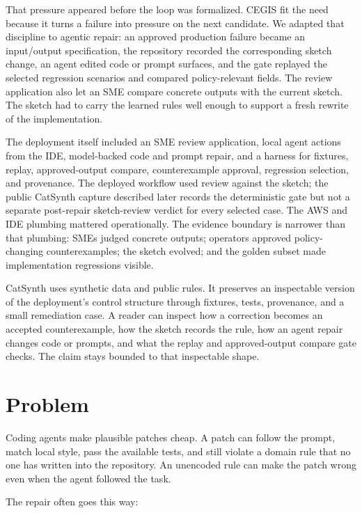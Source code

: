 \documentclass[11pt]{article}
\begin{document}
That pressure appeared before the loop was formalized.  CEGIS fit the need because it turns a
failure into pressure on the next candidate.  We adapted that discipline to agentic repair: an
approved production failure became an input/output specification, the repository recorded the
corresponding sketch change, an agent edited code or prompt surfaces, and the gate replayed the
selected regression scenarios and compared policy-relevant fields.  The review application also
let an SME compare concrete outputs with the current sketch.  The sketch had to carry the learned
rules well enough to support a fresh rewrite of the implementation.

The deployment itself included an SME review application, local agent actions from the IDE,
model-backed code and prompt repair, and a harness for fixtures, replay, approved-output compare,
counterexample approval, regression selection, and provenance.  The deployed workflow used
review against the sketch; the public CatSynth capture described later records the deterministic
gate but not a separate post-repair sketch-review verdict for every selected case.  The AWS and
IDE plumbing mattered
operationally.  The evidence boundary is narrower than that plumbing: SMEs judged concrete
outputs; operators approved policy-changing counterexamples; the sketch evolved; and the golden
subset made implementation regressions visible.

CatSynth uses synthetic data and public rules.  It preserves an inspectable version of the
deployment's control structure through fixtures, tests, provenance, and a small remediation
case.  A reader can
inspect how a correction becomes an accepted counterexample, how the sketch records the rule, how
an agent repair changes code or prompts, and what the replay and approved-output compare gate checks.  The claim
stays bounded to that inspectable shape.

\section{Problem}
\label{sec:problem}

Coding agents make plausible patches cheap.  A patch can follow the prompt, match local
style, pass the available tests, and still violate a domain rule that no one has written
into the repository.  An unencoded rule can make the patch wrong even when the agent followed
the task.

The repair often goes this way:
\end{document}
